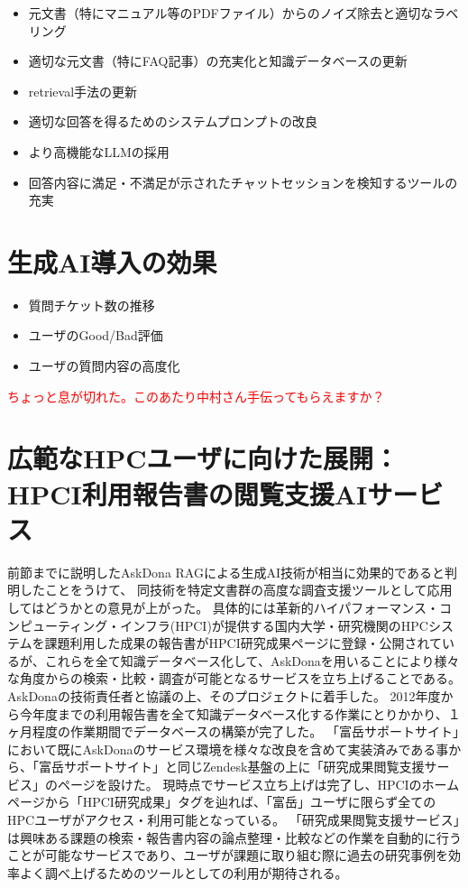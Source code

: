 \documentclass{jsaxiesproc}
\begin{document}
\begin{itemize}
	\item 元文書（特にマニュアル等のPDFファイル）からのノイズ除去と適切なラベリング
	\item 適切な元文書（特にFAQ記事）の充実化と知識データベースの更新
	\item retrieval手法の更新
	\item 適切な回答を得るためのシステムプロンプトの改良
	\item より高機能なLLMの採用
	\item 回答内容に満足・不満足が示されたチャットセッションを検知するツールの充実
\end{itemize}


\section{生成AI導入の効果}

\begin{itemize}

		\item 質問チケット数の推移
		\item ユーザのGood/Bad評価
		\item ユーザの質問内容の高度化
\end{itemize}
\textcolor{red}{
ちょっと息が切れた。このあたり中村さん手伝ってもらえますか？
}






\section{広範なHPCユーザに向けた展開：HPCI利用報告書の閲覧支援AIサービス}
前節までに説明したAskDona RAGによる生成AI技術が相当に効果的であると判明したことをうけて、
同技術を特定文書群の高度な調査支援ツールとして応用してはどうかとの意見が上がった。
具体的には革新的ハイパフォーマンス・コンピューティング・インフラ(HPCI)が提供する国内大学・研究機関のHPCシステムを課題利用した成果の報告書がHPCI研究成果ページに登録・公開されているが、これらを全て知識データベース化して、AskDonaを用いることにより様々な角度からの検索・比較・調査が可能となるサービスを立ち上げることである。
AskDonaの技術責任者と協議の上、そのプロジェクトに着手した。
2012年度から今年度までの利用報告書を全て知識データベース化する作業にとりかかり、１ヶ月程度の作業期間でデータベースの構築が完了した。
「富岳サポートサイト」において既にAskDonaのサービス環境を様々な改良を含めて実装済みである事から、「富岳サポートサイト」と同じZendesk基盤の上に「研究成果閲覧支援サービス」のページを設けた。
現時点でサービス立ち上げは完了し、HPCIのホームページから「HPCI研究成果」タグを辿れば、「富岳」ユーザに限らず全てのHPCユーザがアクセス・利用可能となっている。
「研究成果閲覧支援サービス」は興味ある課題の検索・報告書内容の論点整理・比較などの作業を自動的に行うことが可能なサービスであり、ユーザが課題に取り組む際に過去の研究事例を効率よく調べ上げるためのツールとしての利用が期待される。
\end{document}
